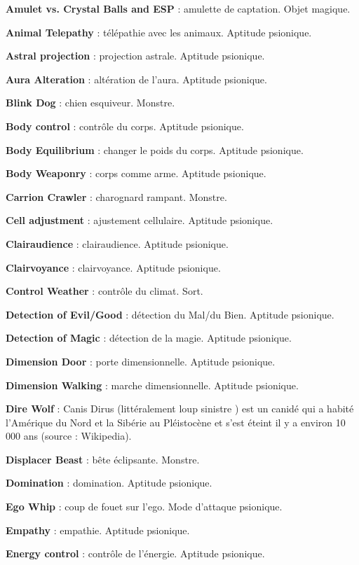 \documentclass[11pt]{article}
\begin{document}
{\parindent0cm

\textbf{Amulet vs. Crystal Balls and ESP} : amulette de captation. Objet magique.

\textbf{Animal Telepathy} : télépathie avec les animaux. Aptitude psionique.

\textbf{Astral projection} : projection astrale. Aptitude psionique.

\textbf{Aura Alteration} : altération de l'aura. Aptitude psionique.

\textbf{Blink Dog} : chien esquiveur. Monstre.

\textbf{Body control} : contrôle du corps. Aptitude psionique.

\textbf{Body Equilibrium} : changer le poids du corps. Aptitude psionique.

\textbf{Body Weaponry} : corps comme arme. Aptitude psionique. %

\textbf{Carrion Crawler} : charognard rampant. Monstre.

\textbf{Cell adjustment} : ajustement cellulaire. Aptitude psionique.

\textbf{Clairaudience} : clairaudience. Aptitude psionique.

\textbf{Clairvoyance} : clairvoyance. Aptitude psionique.

\textbf{Control Weather} : contrôle du climat. Sort.

\textbf{Detection of Evil/Good} : détection du Mal/du Bien. Aptitude psionique.

\textbf{Detection of Magic} : détection de la magie. Aptitude psionique.

\textbf{Dimension Door} : porte dimensionnelle. Aptitude psionique.

\textbf{Dimension Walking} : marche dimensionnelle. Aptitude psionique.

\textbf{Dire Wolf} : Canis Dirus (littéralement \og loup sinistre \fg) est un canidé qui a habité l'Amérique du Nord et la Sibérie au Pléistocène et s’est éteint il y a environ 10 000 ans (source : Wikipedia).

\textbf{Displacer Beast} : bête éclipsante. Monstre.

\textbf{Domination} : domination. Aptitude psionique.

\textbf{Ego Whip} : coup de fouet sur l'ego. Mode d'attaque psionique.

\textbf{Empathy} : empathie. Aptitude psionique.

\textbf{Energy control} : contrôle de l'énergie. Aptitude psionique.

}
\end{document}
